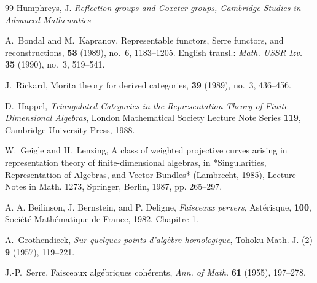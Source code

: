 \documentclass[eqno]{ltjsarticle}
\begin{document}
\begin{thebibliography}{99}
	Humphreys, J. 
	\textit{Reflection groups and Coxeter groups, Cambridge Studies in Advanced Mathematics}

	A.~Bondal and M.~Kapranov,
	\newblock Representable functors, Serre functors, and reconstructions,
	 \textbf{53} (1989), no.~6, 1183--1205.
	\newblock English transl.: {\em Math. USSR Izv.} \textbf{35} (1990), no.~3, 519--541.

	J.~Rickard,
	\newblock Morita theory for derived categories,
	 \textbf{39} (1989), no.~3, 436--456.

D.~Happel,
\emph{Triangulated Categories in the Representation Theory of Finite-Dimensional Algebras},
London Mathematical Society Lecture Note Series \textbf{119},
Cambridge University Press, 1988.

	W.~Geigle and H.~Lenzing,
	\newblock A class of weighted projective curves arising in representation theory of finite-dimensional algebras,
	\newblock in *Singularities, Representation of Algebras, and Vector Bundles* (Lambrecht, 1985), Lecture Notes in Math. 1273, Springer, Berlin, 1987, pp. 265–297.
	
	A. A. Beilinson, J. Bernstein, and P. Deligne,
	\textit{Faisceaux pervers},
	Astérisque, \textbf{100}, Société Mathématique de France, 1982. Chapitre 1.

	A.~Grothendieck,
	\textit{Sur quelques points d'algèbre homologique},
	Tohoku Math. J. (2) \textbf{9} (1957), 119--221.

	J.-P.~Serre,
	\newblock Faisceaux algébriques cohérents,
	\newblock \emph{Ann. of Math.} \textbf{61} (1955), 197--278.

\end{thebibliography}
\end{document}
